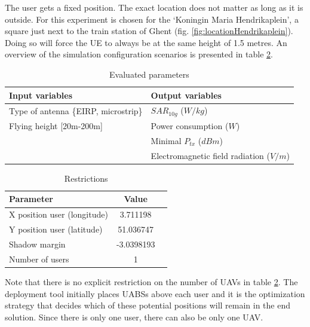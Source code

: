 The user gets a fixed position. The exact location does not matter as long as it is outside. For this experiment is chosen for the 
`Koningin Maria Hendrikaplein', a square just next to the train station of Ghent (fig. \ref{fig:locationHendrikaplein}).  Doing so will force the \gls{UE} 
to always be at the same height of 1.5 metres. 
An overview of the simulation configuration scenarios is presented in table \ref{table:S1:restrictions}.
\newline
\begin{table}[!htb]
\centering
            \begin{tabular}{|l|l|}
            \hline
            \textbf{Input variables  }                    & \textbf{Output variables}          \\   \hline 
            Type of antenna \{EIRP, microstrip\}            & $SAR_{10g}$  ($W/kg$)            \\ 
            Flying height [20m-200m]                        & Power consumption  ($W$)           \\ 
                                                          &  Minimal $P_{tx}$ ($dBm$)\\ 
                                                          & Electromagnetic field radiation ($V/m$)\\
            \hline
            \end{tabular} 
            \caption{Evaluated parameters}
          \label{table:s1:evalpara}
\end{table}
\begin{table}[!htb]
\centering
        \begin{tabular}{|l|c|l|}
        \hline
        \textbf{Parameter}              & \textbf{Value}          \\   \hline 
        X position user (longitude)              & 3.711198       \\    
        Y position user (latitude)               & 51.036747          \\ 
        Shadow margin             & -3.0398193 \\
        Number of users                & 1 \\
        \hline
        \end{tabular}
        \caption{Restrictions}
        \label{table:S1:restrictions}
\end{table}


Note that there is no explicit restriction on the number of \gls{UAV}s in table \ref{table:S1:restrictions}. The deployment tool initially places 
\gls{UABS}s above each user and it is the optimization strategy that decides which of these potential positions will remain in the end solution.
Since there is only one user, there can also be only one \gls{UAV}.




